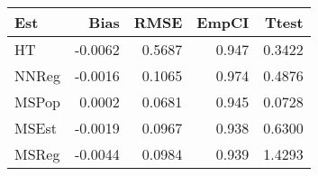 
\begin{tabular}{lrrrr}
\toprule
Est & Bias & RMSE & EmpCI & Ttest\\
\midrule
HT & -0.0062 & 0.5687 & 0.947 & 0.3422\\
NNReg & -0.0016 & 0.1065 & 0.974 & 0.4876\\
MSPop & 0.0002 & 0.0681 & 0.945 & 0.0728\\
MSEst & -0.0019 & 0.0967 & 0.938 & 0.6300\\
MSReg & -0.0044 & 0.0984 & 0.939 & 1.4293\\
\bottomrule
\end{tabular}
